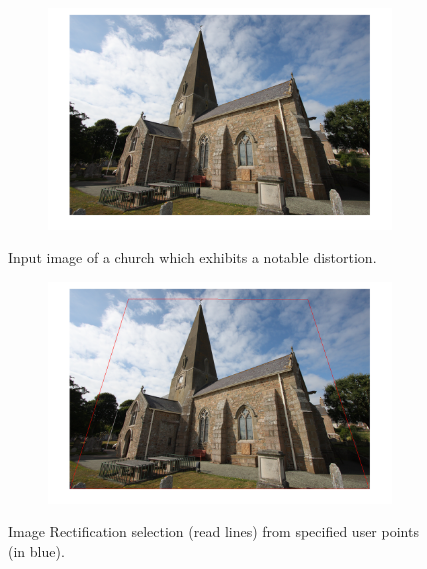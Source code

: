 \documentclass{paper}
\begin{document}
\begin{figure}[H]
    \centering
    \begin{subfigure}{1.0\textwidth}
        \includegraphics[width=\textwidth]{rectify/input_skewed_church}
    \end{subfigure}
    
    \caption{Input image of a church which exhibits a notable distortion.}
    \label{fig:rectify_input_skewed_church}       
\end{figure}

\begin{figure}[H]
    \centering
    \begin{subfigure}{1.0\textwidth}
        \includegraphics[width=\textwidth]{rectify/selection_skewed_church}
    \end{subfigure}
    
    \caption{Image Rectification selection (read lines) from specified user points (in blue).}
    \label{fig:rectify_selection_skewed_church}       
\end{figure}
\end{document}
